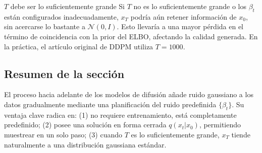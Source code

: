 \begin{warningbox}{$T$ debe ser lo suficientemente grande}
Si $T$ no es lo suficientemente grande o los $\beta_t$ están configurados inadecuadamente, $x_T$ podría aún retener información de $x_0$, sin acercarse lo bastante a $\mathcal{N}(0, I)$. Esto llevaría a una mayor pérdida en el término de coincidencia con la prior del ELBO, afectando la calidad generada. En la práctica, el artículo original de DDPM utiliza $T = 1000$.
\end{warningbox}

\subsection{Resumen de la sección}

El proceso hacia adelante de los modelos de difusión añade ruido gaussiano a los datos gradualmente mediante una planificación del ruido predefinida $\{\beta_t\}$. Su ventaja clave radica en: (1) no requiere entrenamiento, está completamente predefinido; (2) posee una solución en forma cerrada $q(x_t|x_0)$, permitiendo muestrear en un solo paso; (3) cuando $T$ es lo suficientemente grande, $x_T$ tiende naturalmente a una distribución gaussiana estándar.
